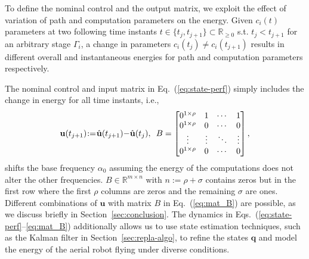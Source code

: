 \documentclass[letterpaper,10pt,journal,twoside]{IEEEtran}
\theoremstyle{definition}
\newtheorem{lem}[thm]{Lemma}
\begin{document}

To define the nominal control and the output matrix, we exploit the effect of variation of path and computation parameters on the energy. 
  Given $c_i(t)$ parameters at two following time instants $t\in\{t_j,t_{j+1}\}\subset\mathbb{R}_{\geq 0}$ s.t. $t_j<t_{j+1}$ for an arbitrary stage $\Gamma_i$, a change in parameters $c_i(t_j)\neq c_i(t_{j+1})$ results in different overall and instantaneous energies for path and computation parameters respectively.


%
The nominal control and input matrix in Eq.~(\ref{eq:state-perf}) simply includes the change in energy for all time instants, i.e.,
\begin{equation}\label{eq:mat_B}
  \mathbf{u}(t_{j+1})\hspace*{-.5ex}:=\hspace*{-.5ex}\hat{\mathbf{u}}(t_{j+1})\hspace*{-.5ex}-\hspace*{-.5ex}\hat{\mathbf{u}}(t_j),\,\,\,B=\begin{bmatrix}
      0^{1\times\rho} & 1      & \cdots & 1      \\
      0^{1\times\rho} & 0      & \cdots & 0      \\ 
      \vdots          & \vdots & \ddots & \vdots \\
      0^{1\times\rho} & 0      & \cdots & 0   
  \end{bmatrix},
\end{equation}
shifts the base frequency $\alpha_0$ assuming the energy of the computations does not alter the other frequencies. $B\in\mathbb{R}^{m\times n}$ with $n:=\rho+\sigma$ contains zeros but in the first row where the first $\rho$ columns are zeros and the remaining $\sigma$ are ones. Different combinations of $\mathbf{u}$ with matrix $B$ in Eq.~(\ref{eq:mat_B}) are possible, as we discuss briefly in Section~\ref{sec:conclusion}.
The dynamics in Eqs.~(\ref{eq:state-perf}--\ref{eq:mat_B}) additionally allows us to use state estimation techniques, such as the Kalman filter in Section~\ref{sec:repla-algo}, to refine the states $\mathbf{q}$ and model the energy of the aerial robot flying under diverse %
conditions.
\end{document}
